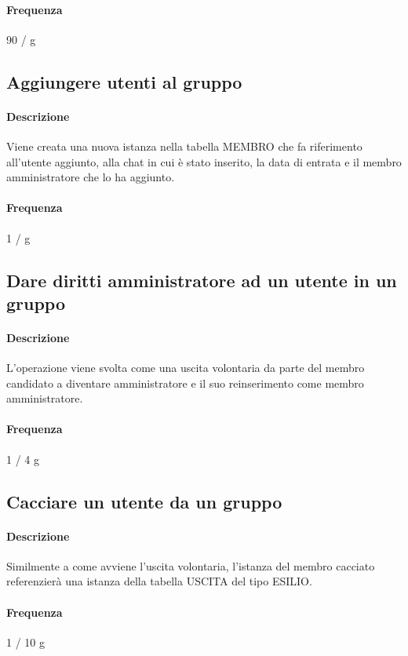 \documentclass[a4paper,12pt]{report}
\begin{document}
\paragraph{Frequenza} 90 / g

\subsection{Aggiungere utenti al gruppo}
\paragraph{Descrizione} Viene creata una nuova istanza nella tabella MEMBRO che fa riferimento all'utente aggiunto, alla chat in cui è stato inserito, la data di entrata e il membro amministratore che lo ha aggiunto.
\paragraph{Frequenza} 1 / g

\subsection{Dare diritti amministratore ad un utente in un gruppo}
\paragraph{Descrizione} L'operazione viene svolta come una uscita volontaria da parte del membro candidato a diventare amministratore e il suo reinserimento come membro amministratore.
\paragraph{Frequenza} 1 / 4 g

\subsection{Cacciare un utente da un gruppo}
\paragraph{Descrizione} Similmente a come avviene l'uscita volontaria, l'istanza del membro cacciato referenzierà una istanza della tabella USCITA del tipo ESILIO.
\paragraph{Frequenza} 1 / 10 g
\end{document}
